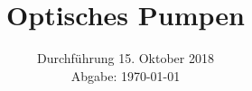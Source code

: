 

\subject{V21}
\title{Optisches Pumpen}
\date{%
  Durchführung 15. Oktober 2018
  \\
  Abgabe: \today
}



\maketitle
\thispagestyle{empty}
\tableofcontents
\newpage





% 

\printbibliography{}


